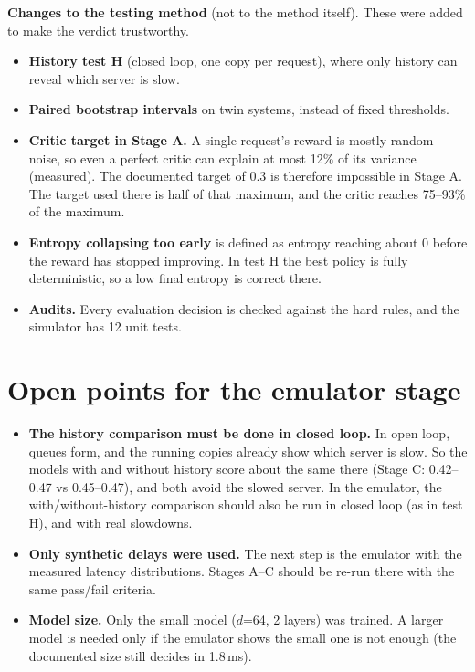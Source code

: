 \documentclass[10pt,a4paper]{article}
\begin{document}
\textbf{Changes to the testing method} (not to the method itself). These were added to make the verdict trustworthy.
\begin{itemize}
\item \textbf{History test H} (closed loop, one copy per request), where only history can reveal which server is slow.
\item \textbf{Paired bootstrap intervals} on twin systems, instead of fixed thresholds.
\item \textbf{Critic target in Stage A.} A single request's reward is mostly random noise, so even a perfect critic can explain at most 12\% of its variance (measured). The documented target of 0.3 is therefore impossible in Stage A. The target used there is half of that maximum, and the critic reaches 75--93\% of the maximum.
\item \textbf{Entropy collapsing too early} is defined as entropy reaching about 0 before the reward has stopped improving. In test H the best policy is fully deterministic, so a low final entropy is correct there.
\item \textbf{Audits.} Every evaluation decision is checked against the hard rules, and the simulator has 12 unit tests.
\end{itemize}

\section{Open points for the emulator stage}\label{sec:open}
\begin{itemize}
\item \textbf{The history comparison must be done in closed loop.} In open loop, queues form, and the running copies already show which server is slow. So the models with and without history score about the same there (Stage C: 0.42--0.47 vs 0.45--0.47), and both avoid the slowed server. In the emulator, the with/without-history comparison should also be run in closed loop (as in test H), and with real slowdowns.
\item \textbf{Only synthetic delays were used.} The next step is the emulator with the measured latency distributions. Stages A--C should be re-run there with the same pass/fail criteria.
\item \textbf{Model size.} Only the small model ($d$=64, 2 layers) was trained. A larger model is needed only if the emulator shows the small one is not enough (the documented size still decides in 1.8\,ms).
\end{itemize}
\end{document}
